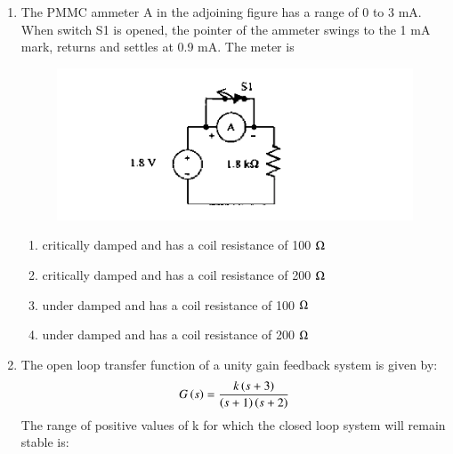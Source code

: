 \documentclass[journal,12pt,onecolumn]{IEEEtran}
\theoremstyle{remark}
\begin{document}
\begin{enumerate}
\hfill{}
\begin{enumerate}
\end{enumerate}

\item  The PMMC ammeter A in the adjoining figure has a range of 0 to 3 mA. When switch S1 is opened, the pointer of the ammeter swings to the 1 mA mark, returns and settles at 0.9 mA. The meter is
\begin{figure}[H]
    \centering
    \includegraphics[width = 0.7\columnwidth]{q11}
    \caption*{}
    \label{Q11}
\end{figure}

\hfill{}
\begin{enumerate}
\item  critically damped and has a coil resistance of 100 $\ohm$
\item critically damped and has a coil resistance of 200 $\ohm$
\item under damped and has a coil resistance of 100 $\ohm$
\item under damped and has a coil resistance of 200 $\ohm$
\end{enumerate}

\item The open loop transfer function of a unity gain feedback system is given by: $$G\left(s\right) = \frac{k\left(s+3\right)}{\left(s+1\right)\left(s+2\right)}$$The range of positive values of k for which the closed loop system will remain stable is:

\hfill{}
\begin{enumerate}
\end{enumerate}


\end{enumerate}
\end{document}
